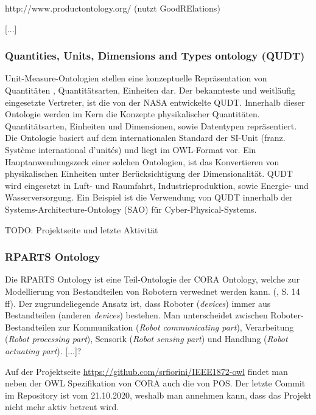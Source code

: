 \documentclass{article}
\begin{document}
http://www.productontology.org/ (nutzt GoodRElations)

[...]

\subsubsection{Quantities, Units, Dimensions and Types ontology (QUDT)}

Unit-Measure-Ontologien stellen eine konzeptuelle Repräsentation von Quantitäten , Quantitätsarten, Einheiten dar. Der bekannteste und weitläufig eingesetzte Vertreter, ist die von der NASA entwickelte QUDT\cite{QUDTOntology}. Innerhalb dieser Ontologie werden im Kern die Konzepte physikalischer Quantitäten. Quantitätsarten, Einheiten und Dimensionen, sowie Datentypen repräsentiert. Die Ontologie basiert auf dem internationalen Standard der SI-Unit (franz. Système international d'unités) und liegt im OWL-Format vor. Ein Hauptanwendungszeck einer solchen Ontologien, ist das Konvertieren von physikalischen  Einheiten unter Berücksichtigung der Dimensionalität.
QUDT wird eingesetzt in Luft- und Raumfahrt, Industrieproduktion, sowie Energie- und Wasserversorgung. Ein Beispiel ist die Verwendung von QUDT innerhalb der Systems-Architecture-Ontology (SAO) für Cyber-Physical-Systems.

TODO: Projektseite und letzte Aktivität

\subsubsection{RPARTS Ontology}


Die RPARTS Ontology ist eine Teil-Ontologie der CORA Ontology, welche zur Modellierung von Bestandteilen von Robotern verwednet werden kann. (\cite{fiorini2015extensions}, S. 14 ff).
Der zugrundeliegende Ansatz ist, dass Roboter (\textit{devices}) immer aus Bestandteilen (anderen \textit{devices}) bestehen.
Man unterscheidet zwischen Roboter-Bestandteilen zur Kommunikation (\textit{Robot communicating part}), Verarbeitung (\textit{Robot processing part}), Sensorik (\textit{Robot sensing part}) und Handlung (\textit{Robot actuating part}).
[...]?

Auf der Projektseite \url{https://github.com/srfiorini/IEEE1872-owl} findet man neben der OWL Spezifikation von CORA auch die von POS. Der letzte Commit im Repository ist vom 21.10.2020, weshalb man annehmen kann, dass das Projekt nicht mehr aktiv betreut wird.
\end{document}
